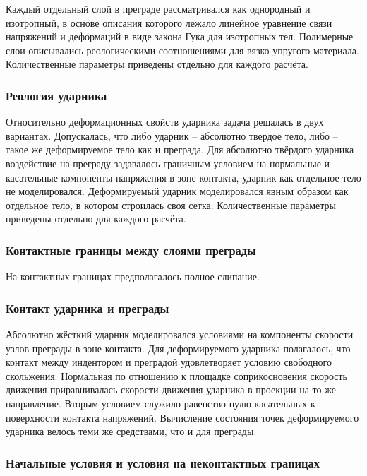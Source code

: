 Каждый отдельный слой в преграде рассматривался как однородный и изотропный, в основе описания которого лежало линейное уравнение связи напряжений и деформаций в виде закона Гука для изотропных тел. Полимерные слои описывались реологическими соотношениями для вязко-упругого материала. Количественные параметры приведены отдельно для каждого расчёта.

\subsubsection*{Реология ударника}

Относительно деформационных свойств ударника задача решалась в двух вариантах. Допускалась, что либо ударник -- абсолютно твердое тело, либо -- такое же деформируемое тело как и преграда. Для абсолютно твёрдого ударника воздействие на преграду задавалось граничным условием на нормальные и касательные компоненты напряжения в зоне контакта, ударник как отдельное тело не моделировался. Деформируемый ударник моделировался явным образом как отдельное тело, в котором строилась своя сетка. Количественные параметры приведены отдельно для каждого расчёта.

\subsubsection*{Контактные границы между слоями преграды}

На контактных границах предполагалось полное слипание.

\subsubsection*{Контакт ударника и преграды}

Абсолютно жёсткий ударник моделировался условиями на компоненты скорости узлов преграды в зоне контакта. Для деформируемого ударника полагалось, что контакт между индентором и преградой удовлетворяет условию свободного скольжения. Нормальная по отношению к площадке соприкосновения скорость движения приравнивалась скорости движения ударника в проекции на то же направление. Вторым условием служило равенство нулю касательных к поверхности контакта напряжений. Вычисление состояния точек деформируемого ударника велось теми же средствами, что и для преграды.

\subsubsection*{Начальные условия и условия на неконтактных границах}

